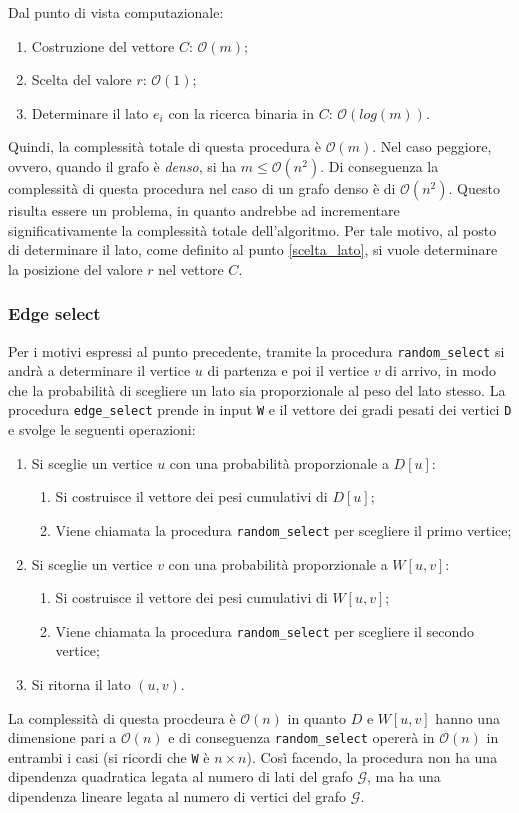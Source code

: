 Dal punto di vista computazionale:
\begin{enumerate}
    \item Costruzione del vettore $C$: $\mathcal{O}(m)$;
    \item Scelta del valore $r$: $\mathcal{O}(1)$;
    \item Determinare il lato $e_i$ con la ricerca binaria in $C$: 
    $\mathcal{O}(log(m))$.
\end{enumerate}
Quindi, la complessità totale di questa procedura è $\mathcal{O}(m)$. Nel caso 
peggiore, ovvero, quando il grafo è \textit{denso}, si ha $m \le \mathcal{O}(n^2)$. 
Di conseguenza la complessità di questa procedura nel caso di un grafo denso è di 
$\mathcal{O}(n^2)$. Questo risulta essere un problema, in quanto andrebbe ad 
incrementare significativamente la complessità totale dell'algoritmo. Per tale 
motivo, al posto di determinare il lato, come definito al punto \ref{scelta_lato}, 
si vuole determinare la posizione del valore $r$ nel vettore $C$.

\subsubsection*{Edge select}
Per i motivi espressi al punto 
precedente, tramite la procedura \verb|random_select| si andrà a determinare il 
vertice $u$ di partenza e poi il vertice $v$ di arrivo, in modo che la probabilità 
di scegliere un lato sia proporzionale al peso del lato stesso. La procedura 
\verb|edge_select| prende in input \verb|W| e il vettore dei gradi pesati dei 
vertici \verb|D| e svolge le seguenti operazioni:
\begin{enumerate}
    \item Si sceglie un vertice $u$ con una probabilità proporzionale a $D[u]$:
    \begin{enumerate}
        \item Si costruisce il vettore dei pesi cumulativi di $D[u]$;
        \item Viene chiamata la procedura \verb|random_select| per scegliere il 
        primo vertice;
    \end{enumerate}
    \item Si sceglie un vertice $v$ con una probabilità proporzionale a $W[u,v]$:
    \begin{enumerate}
        \item Si costruisce il vettore dei pesi cumulativi di $W[u,v]$;
        \item Viene chiamata la procedura \verb|random_select| per scegliere il 
        secondo vertice;
    \end{enumerate}
    \item Si ritorna il lato $(u,v)$.
\end{enumerate}
La complessità di questa procdeura è $\mathcal{O}(n)$ in quanto $D$ e $W[u,v]$ 
hanno una dimensione pari a $\mathcal{O}(n)$ e di conseguenza \verb|random_select| 
opererà in $\mathcal{O}(n)$ in entrambi i casi (si ricordi che \verb|W| è 
$n \times n$). Così facendo, la procedura non ha una dipendenza quadratica legata 
al numero di lati del grafo $\mathcal{G}$, ma ha una dipendenza lineare legata al 
numero di vertici del grafo $\mathcal{G}$.

